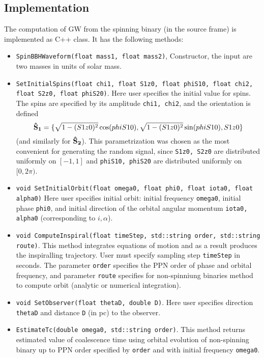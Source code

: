 \documentclass[11pt]{report}
\def\be{\begin{equation}}
\def\ee{\end{equation}}
\def\bSo{{\bf \hat{S}_1}}
\def\bSt{{\bf \hat{S}_2}}
\begin{document}

\subsection{Implementation}

The computation of GW from the spinning binary (in the source frame)
is implemented as  C++ class. It has the following methods:
\begin{itemize}
\item {\tt SpinBBHWaveform(float mass1, float mass2)}, Constructor, the
input are two masses in units of solar mass.

\item {\tt SetInitialSpins(float chi1, float S1z0, float phiS10, float chi2, float S2z0,
		   float phiS20)}. Here user specifies the initial value for spins.
The spins are specified by its amplitude {\tt chi1, chi2}, and the orientation
is defined 
\be
\bSo = \{ \sqrt{1-(S1z0)^2}\cos(phiS10), \sqrt{1-(S1z0)^2}\sin(phiS10),
S1z0\}
\ee
(and similarly for $\bSt$). 
This parametrization was chosen as the most convenient for generating the 
random signal, since {\tt S1z0, S2z0} are distributed uniformly on $[-1,1]$ and
{\tt phiS10, phiS20} are distributed uniformly on $[0, 2\pi)$. 

\item {\tt void SetInitialOrbit(float omega0, float phi0, float iota0, float alpha0)}
Here user specifies initial orbit: initial frequency {\tt omega0}, initial
 phase {\tt phi0}, and initial direction of the orbital angular momentum 
 {\tt iota0, alpha0} (corresponding to $i,\alpha$). 
 
\item {\tt void ComputeInspiral(float timeStep, std::string order, std::string route)}. This method integrates 
equations of motion and as a result produces the inspiralling trajectory.
User must specify sampling step {\tt timeStep} in seconds.
The parameter {\tt order} specifies the PPN order of phase
and orbital frequency, and parameter {\tt route} specifies
for non-spinniung binaries method to compute orbit 
(analytic or numerical integration).

\item {\tt void SetObserver(float thetaD, double D)}. Here user specifies direction
{\tt thetaD} and distance {\tt D} (in pc) to the observer.

\item {\tt EstimateTc(double omega0, std::string order)}.
This method returns estimated value of coalescence time
using orbital evolution of non-spinning binary up to
PPN order specified by {\tt order} and with initial frequency
{\tt omega0}.


\end{itemize}
\end{document}
